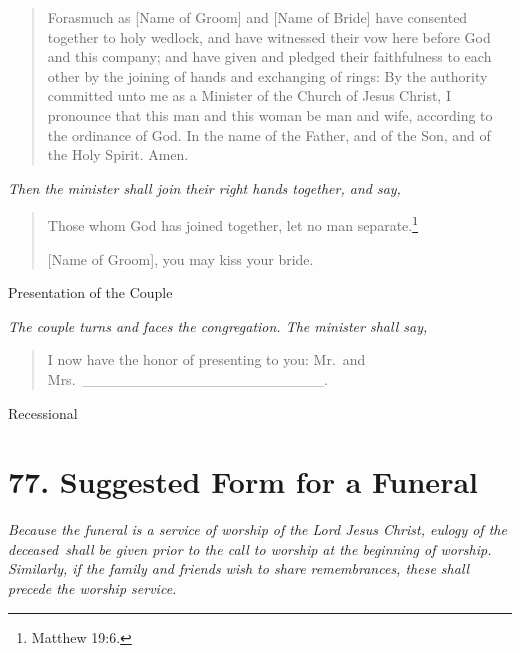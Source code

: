 \documentclass[
]{book}
\begin{document}
\begin{quote}
Forasmuch as {[}Name of Groom{]} and {[}Name of Bride{]} have consented together to holy wedlock, and have witnessed their vow here before God and this company; and have given and pledged their faithfulness to each other by the joining of hands and exchanging of rings: By the authority committed unto me as a Minister of the Church of Jesus Christ, I pronounce that this man and this woman be man and wife, according to the ordinance of God. In the name of the Father, and of the Son, and of the Holy Spirit. Amen.
\end{quote}

\begin{center}
\emph{Then the minister shall join their right hands together, and say,}

\end{center}

\begin{quote}
Those whom God has joined together, let no man separate.\footnote{Matthew 19:6.}

{[}Name of Groom{]}, you may kiss your bride.
\end{quote}

Presentation of the Couple

\begin{center}
\emph{The couple turns and faces the congregation. The minister shall say,}

\end{center}

\begin{quote}
I now have the honor of presenting to you: Mr.~and Mrs.~\_\_\_\_\_\_\_\_\_\_\_\_\_\_\_\_\_\_\_\_\_\_\_.
\end{quote}

Recessional

\hypertarget{suggested-form-for-a-funeral}{%
\section*{77. Suggested Form for a Funeral}\label{suggested-form-for-a-funeral}}

\protect\hypertarget{chapter-slug-77-suggested-form-for-a-funeral}{\href{}{}}

\protect\hypertarget{77}{\href{}{}}\emph{Because the funeral is a service of worship of the Lord Jesus Christ, eulogy of the deceased~shall be given prior to the call to worship at the beginning of worship. Similarly, if the family and friends wish to share remembrances, these shall precede the worship service.}
\end{document}
